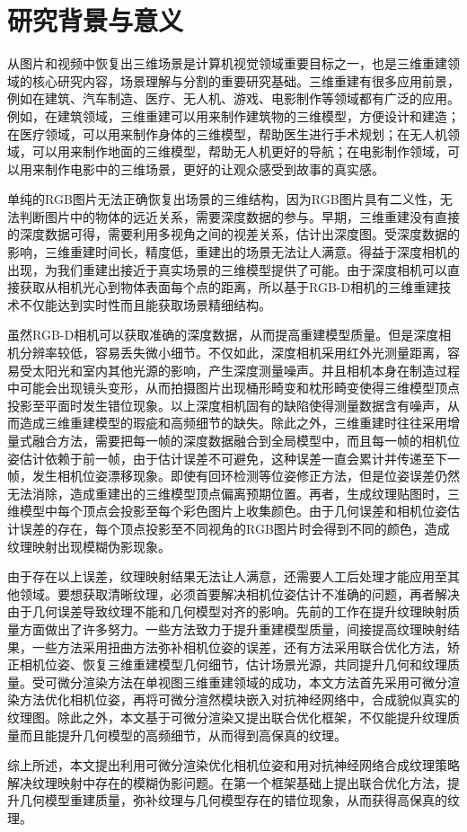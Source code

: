\section{研究背景与意义}
从图片和视频中恢复出三维场景是计算机视觉领域重要目标之一，也是三维重建领域的核心研究内容，场景理解与分割的重要研究基础。三维重建有很多应用前景，例如在建筑、汽车制造、医疗、无人机、游戏、电影制作等领域都有广泛的应用。例如，在建筑领域，三维重建可以用来制作建筑物的三维模型，方便设计和建造；在医疗领域，可以用来制作身体的三维模型，帮助医生进行手术规划；在无人机领域，可以用来制作地面的三维模型，帮助无人机更好的导航；在电影制作领域，可以用来制作电影中的三维场景，更好的让观众感受到故事的真实感。\par
单纯的RGB图片无法正确恢复出场景的三维结构，因为RGB图片具有二义性，无法判断图片中的物体的远近关系，需要深度数据的参与。早期，三维重建没有直接的深度数据可得，需要利用多视角之间的视差关系，估计出深度图。受深度数据的影响，三维重建时间长，精度低，重建出的场景无法让人满意。得益于深度相机的出现，为我们重建出接近于真实场景的三维模型提供了可能。由于深度相机可以直接获取从相机光心到物体表面每个点的距离，所以基于RGB-D相机的三维重建技术不仅能达到实时性而且能获取场景精细结构。\par
虽然RGB-D相机可以获取准确的深度数据，从而提高重建模型质量。但是深度相机分辨率较低，容易丢失微小细节。不仅如此，深度相机采用红外光测量距离，容易受太阳光和室内其他光源的影响，产生深度测量噪声。并且相机本身在制造过程中可能会出现镜头变形，从而拍摄图片出现桶形畸变和枕形畸变使得三维模型顶点投影至平面时发生错位现象。以上深度相机固有的缺陷使得测量数据含有噪声，从而造成三维重建模型的瑕疵和高频细节的缺失。除此之外，三维重建时往往采用增量式融合方法，需要把每一帧的深度数据融合到全局模型中，而且每一帧的相机位姿估计依赖于前一帧，由于估计误差不可避免，这种误差一直会累计并传递至下一帧，发生相机位姿漂移现象。即使有回环检测等位姿修正方法，但是位姿误差仍然无法消除，造成重建出的三维模型顶点偏离预期位置。再者，生成纹理贴图时，三维模型中每个顶点会投影至每个彩色图片上收集颜色。由于几何误差和相机位姿估计误差的存在，每个顶点投影至不同视角的RGB图片时会得到不同的颜色，造成纹理映射出现模糊伪影现象。\par
由于存在以上误差，纹理映射结果无法让人满意，还需要人工后处理才能应用至其他领域。要想获取清晰纹理，必须首要解决相机位姿估计不准确的问题，再者解决由于几何误差导致纹理不能和几何模型对齐的影响。先前的工作在提升纹理映射质量方面做出了许多努力。一些方法致力于提升重建模型质量，间接提高纹理映射结果，一些方法采用扭曲方法弥补相机位姿的误差，还有方法采用联合优化方法，矫正相机位姿、恢复三维重建模型几何细节，估计场景光源，共同提升几何和纹理质量。受可微分渲染方法在单视图三维重建领域的成功，本文方法首先采用可微分渲染方法优化相机位姿，再将可微分渲然模块嵌入对抗神经网络中，合成貌似真实的纹理图。除此之外，本文基于可微分渲染又提出联合优化框架，不仅能提升纹理质量而且能提升几何模型的高频细节，从而得到高保真的纹理。\par
综上所述，本文提出利用可微分渲染优化相机位姿和用对抗神经网络合成纹理策略解决纹理映射中存在的模糊伪影问题。在第一个框架基础上提出联合优化方法，提升几何模型重建质量，弥补纹理与几何模型存在的错位现象，从而获得高保真的纹理。
